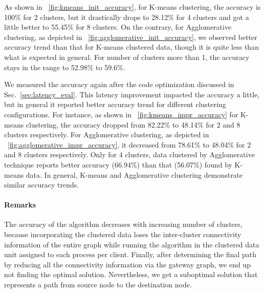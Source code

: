 As shown in \figurename~\ref{fig:kmeans_init_accuracy}, for K-means clustering, the accuracy is 100\% for 2 clusters,
but it drastically drops to 28.12\% for 4 clusters and got a little better to 55.45\% for 8 clusters.
On the contrary, for Agglomerative clustering, as depicted in \figurename~\ref{fig:agglomerative_init_accuracy},
we observed better accuracy trend than that for K-means clustered data, though it is quite less than what is expected
in general. For number of clusters more than 1, the accuracy stays in the range to 52.98\% to 59.6\%.

We measured the accuracy again after the code optimization discussed in Sec.~\ref{sec:latency_eval}.
This latency improvement impacted the accuracy a little, but in general it reported better accuracy
trend for different clustering configurations.
For instance, as shown in \figurename~\ref{fig:kmeans_impr_accuracy} for K-means clustering, the accuracy
dropped from 82.22\% to 48.14\% for 2 and 8 clusters respectively. For Agglomerative clustering, as depicted
in \figurename~\ref{fig:agglomerative_impr_accuracy}, it decreased from 78.61\% to 48.04\% for 2 and 8 clusters
respectively. Only for 4 clusters, data clustered by Agglomerative technique reports better accuracy (66.94\%) than
that (56.07\%) found by K-means data. In general, K-means and Agglomerative clustering demonstrate similar accuracy
trends.

\paragraph{Remarks}
The accuracy of the algorithm decreases with increasing number of clusters, because incorporating the clustered data
loses the inter-cluster connectivity information of the entire graph while running the algorithm in the
clustered data unit assigned to each process per client. Finally, after determining the final path by reducing
all the connectivity information via the gateway graph, we end up not finding the optimal solution. Nevertheless,
we get a suboptimal solution that represents a path from source node to the destination node.
